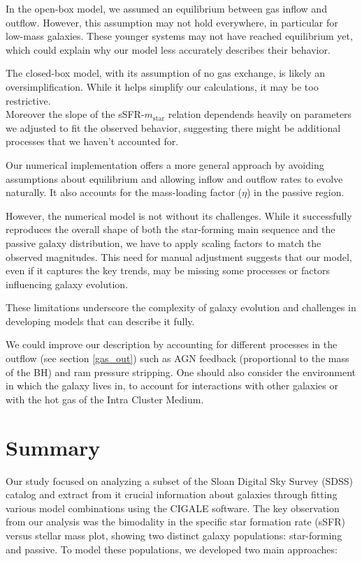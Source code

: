 \documentclass[fleqn,usenatbib]{mnras}
\begin{document}
In the open-box model, we assumed an equilibrium between gas inflow and outflow. However, this assumption may not hold everywhere, in particular for low-mass galaxies. These younger systems may not have reached equilibrium yet, which could explain why our model less accurately describes their behavior.

The closed-box model, with its assumption of no gas exchange, is likely an oversimplification. While it helps simplify our calculations, it may be too restrictive.\\
Moreover the slope of the sSFR-$m_\text{star}$ relation dependends heavily on parameters we adjusted to fit the observed behavior, suggesting there might be additional processes that we haven't accounted for.

Our numerical implementation offers a more general approach by avoiding assumptions about equilibrium and allowing inflow and outflow rates to evolve naturally. It also accounts for the mass-loading factor ($\eta$) in the passive region.

However, the numerical model is not without its challenges. While it successfully reproduces the overall shape of both the star-forming main sequence and the passive galaxy distribution, we have to apply scaling factors to match the observed magnitudes. This need for manual adjustment suggests that our model, even if it captures the key trends, may be missing some  processes or factors influencing galaxy evolution.

These limitations underscore the complexity of galaxy evolution and challenges in developing models that can describe it fully.

We could improve our description by accounting for different processes in the outflow (see  section \ref{gas_out}) such as AGN feedback (proportional to the mass of the BH) and ram pressure stripping. 
One should also consider the environment in which the galaxy lives in, to account for interactions with other galaxies or with the hot gas of the Intra Cluster Medium.

\section{Summary}

Our study focused on analyzing a subset of the Sloan Digital Sky Survey (SDSS) catalog and extract from it crucial information about galaxies through fitting various model combinations using the CIGALE software. 
The key observation from our analysis was the bimodality in the specific star formation rate (sSFR) versus stellar mass plot, showing two distinct galaxy populations: star-forming and passive.
To model these populations, we developed two main approaches:
\end{document}
